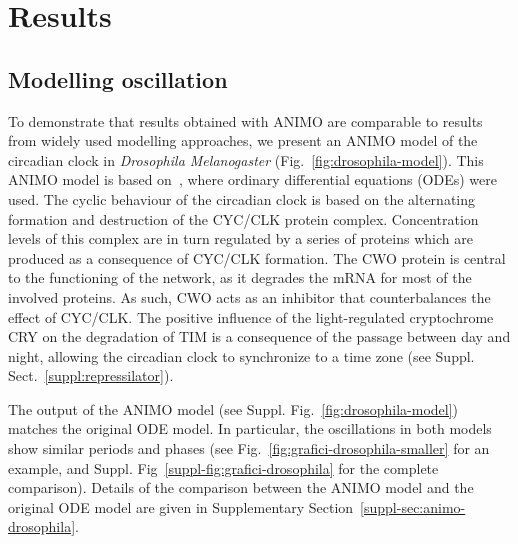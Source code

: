 \documentclass{bmcart}
\def\tas{Timed Automata}
\begin{document}



\section*{Results}\label{sec:results}
\subsection*{Modelling oscillation}\label{sec:animo-drosophila}
To demonstrate that results obtained with ANIMO are comparable to results from widely used modelling
approaches, we present 
an ANIMO model of the circadian clock in \emph{Drosophila Melanogaster} (Fig.~\ref{fig:drosophila-model}).
This ANIMO model is based on~\cite{drosophila-ode-model},
where ordinary differential equations (ODEs) were used.
The cyclic behaviour of the circadian clock is based on the alternating formation and destruction of the
CYC/CLK protein complex.
Concentration levels of this complex are in turn regulated by a series of proteins which are produced as
a consequence of CYC/CLK formation. The CWO protein
is central to the functioning of the network, as it degrades the mRNA for most of the involved proteins.
As such, CWO acts as an inhibitor that counterbalances the effect of CYC/CLK.
The positive influence of the light-regulated cryptochrome CRY on the degradation of TIM is a consequence
of the passage between day and night, allowing
the circadian clock to synchronize to a time zone (see Suppl. Sect.~\ref{suppl:repressilator}).


The output of the ANIMO model (see Suppl. Fig.~\ref{fig:drosophila-model}) matches the original ODE model.
In particular, the oscillations in both models show similar periods and phases (see Fig.~\ref{fig:grafici-drosophila-smaller} for
an example, and Suppl. Fig~\ref{suppl-fig:grafici-drosophila} for the complete comparison).
Details of the comparison
between the ANIMO model and the original ODE model are given in Supplementary Section~\ref{suppl-sec:animo-drosophila}.
\end{document}
